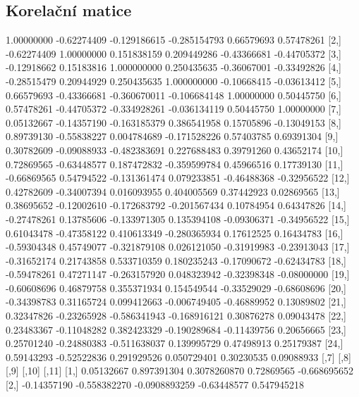 \documentclass[a4paper]{ article}
\begin{document}
\subsection{Korelační matice}
\begin{table}[H]

\begin{Schunk}
\begin{Soutput}
             [,1]        [,2]         [,3]         [,4]        [,5]        [,6]
 [1,]  1.00000000 -0.62274409 -0.129186615 -0.285154793  0.66579693  0.57478261
 [2,] -0.62274409  1.00000000  0.151838159  0.209449286 -0.43366681 -0.44705372
 [3,] -0.12918662  0.15183816  1.000000000  0.250435635 -0.36067001 -0.33492826
 [4,] -0.28515479  0.20944929  0.250435635  1.000000000 -0.10668415 -0.03613412
 [5,]  0.66579693 -0.43366681 -0.360670011 -0.106684148  1.00000000  0.50445750
 [6,]  0.57478261 -0.44705372 -0.334928261 -0.036134119  0.50445750  1.00000000
 [7,]  0.05132667 -0.14357190 -0.163185379  0.386541958  0.15705896 -0.13049153
 [8,]  0.89739130 -0.55838227  0.004784689 -0.171528226  0.57403785  0.69391304
 [9,]  0.30782609 -0.09088933 -0.482383691  0.227688483  0.39791260  0.43652174
[10,]  0.72869565 -0.63448577  0.187472832 -0.359599784  0.45966516  0.17739130
[11,] -0.66869565  0.54794522 -0.131361474  0.079233851 -0.46488368 -0.32956522
[12,]  0.42782609 -0.34007394  0.016093955  0.404005569  0.37442923  0.02869565
[13,]  0.38695652 -0.12002610 -0.172683792 -0.201567434  0.10784954  0.64347826
[14,] -0.27478261  0.13785606 -0.133971305  0.135394108 -0.09306371 -0.34956522
[15,]  0.61043478 -0.47358122  0.410613349 -0.280365934  0.17612525  0.16434783
[16,] -0.59304348  0.45749077 -0.321879108  0.026121050 -0.31919983 -0.23913043
[17,] -0.31652174  0.21743858  0.533710359  0.180235243 -0.17090672 -0.62434783
[18,] -0.59478261  0.47271147 -0.263157920  0.048323942 -0.32398348 -0.08000000
[19,] -0.60608696  0.46879758  0.355371934  0.154549544 -0.33529029 -0.68608696
[20,] -0.34398783  0.31165724  0.099412663 -0.006749405 -0.46889952  0.13089802
[21,]  0.32347826 -0.23265928 -0.586341943 -0.168916121  0.30876278  0.09043478
[22,]  0.23483367 -0.11048282  0.382423329 -0.190289684 -0.11439756  0.20656665
[23,]  0.25701240 -0.24880383 -0.511638037  0.139995729  0.47498913  0.25179387
[24,]  0.59143293 -0.52522836  0.291929526  0.050729401  0.30230535  0.09088933
             [,7]         [,8]          [,9]       [,10]        [,11]
 [1,]  0.05132667  0.897391304  0.3078260870  0.72869565 -0.668695652
 [2,] -0.14357190 -0.558382270 -0.0908893259 -0.63448577  0.547945218

\end{Soutput}
\end{Schunk}
\end{table}
\end{document}
